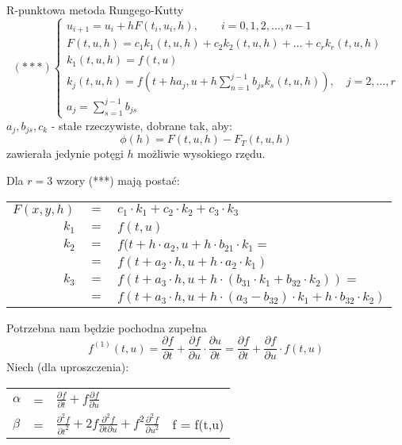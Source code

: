 \begin{frame}{R-punktowa metoda Rungego-Kutty}
	$$(***)\left\{\begin{array}{l}
	u_{i+1} = u_i + h F(t_i,u_i,h), \qquad i = 0,1,2,\ldots,n-1\\
    F(t,u,h) = c_1k_1(t,u,h) + c_2k_2(t,u,h)+\ldots+c_rk_r(t,u,h)\\
    k_1(t,u,h) = f(t,u) \\
    k_j(t,u,h) = f(t+ha_j,u+h \sum_{n=1}^{j-1}b_{js}k_s(t,u,h)), \quad j = 2,\ldots,r \\
    a_j = \sum_{s=1}^{j-1}b_{js}
	\end{array}\right.$$
    $a_j, b_{js}, c_k$ - stałe rzeczywiste, dobrane tak, aby:
    $$\phi(h) = F(t,u,h) - F_T(t,u,h)$$
    zawierała jedynie potęgi $h$ możliwie wysokiego rzędu. 	
\end{frame}
\begin{frame}
    Dla $r = 3$ wzory (***) mają postać:
   	\newline
    \begin{tabular}{rcl}
    	$F(x,y,h)$ & $=$ & $c_1 \cdot k_1 + c_2 \cdot k_2 + c_3 \cdot k_3$ \\
        $k_1$ & $=$ & $f(t,u)$ \\
        $k_2$ & $=$ & $f(t + h \cdot a_2, u + h \cdot b_{21} \cdot k_1 =$ \\
         & $=$ & $f(t+a_2 \cdot h, u+h \cdot a_2 \cdot k_1) $\\
        $k_3$ & $=$ & $f(t+a_3 \cdot h, u+h \cdot (b_{31} \cdot k_1 + b_{32} \cdot k_2)) = $ \\
         & $=$ & $f(t+a_3 \cdot h, u+h \cdot (a_3 - b_{32}) \cdot k_1 + h \cdot b_{32} \cdot k_2)$
    \end{tabular}
    Potrzebna nam będzie pochodna zupełna
    $$f^{(1)}(t,u) = \frac{\partial f}{\partial t}+\frac{\partial f}{\partial u} \cdot \frac{\partial u}{\partial t}=\frac{\partial f}{\partial t}+ 
    \frac{\partial f}{\partial u} \cdot f(t,u)$$
    	Niech (dla uproszczenia):
    \begin{tabular}{lcll}
    $\alpha$ & = & $\frac{\partial f}{\partial t}+f\frac{\partial f}{\partial u}$ & \\
    $\beta$ & = & $\frac{\partial^2f}{\partial t^2}+2f\frac{\partial^2f}{\partial t \partial u}+f^2\frac{\partial^2f}{\partial u^2}$ & f = f(t,u)
    \end{tabular}
\end{frame}
